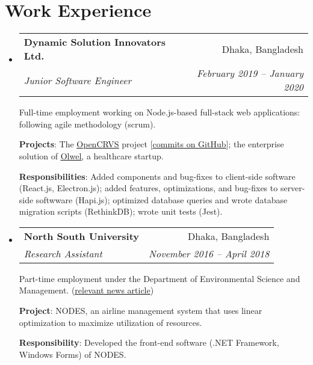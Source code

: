 \documentclass[a4-paper,10pt]{article}
\makeatletter
\newcommand{\resumeItem}[2]{
  \item\small{
    \textbf{#1}{: #2 \vspace{-2pt}}
  }
}
\newcommand{\resumeSubheading}[4]{
  \vspace{-1pt}\item
    \begin{tabular*}{0.97\textwidth}[t]{l@{\extracolsep{\fill}}r}
      \textbf{#1} & #2 \\
      \textit{#3} & \textit{ #4} \\
    \end{tabular*}\vspace{-5pt}
}
\newcommand{\resumeSubSubheading}[2]{
    \begin{tabular*}{0.97\textwidth}{l@{\extracolsep{\fill}}r}
      \textit{\small#1} & \textit{\small #2} \\
    \end{tabular*}\vspace{-5pt}
}
\newcommand{\resumeSubHeadingListStart}{\begin{itemize}[leftmargin=*]}
\newcommand{\resumeSubHeadingListEnd}{\end{itemize}}
\newcommand{\resumeItemListStart}{\begin{itemize}}
\newcommand{\resumeItemListEnd}{\end{itemize}\vspace{-5pt}}
\makeatother
\begin{document}
\section{Work Experience}
  \resumeSubHeadingListStart

    \resumeSubheading
      {Dynamic Solution Innovators Ltd.}{Dhaka, Bangladesh}
      {Junior Software Engineer}{February 2019 -- January 2020}
      
      Full-time employment working on Node.js-based full-stack web applications:  following agile methodology (scrum).
      
      \textbf{Projects}: The \href{https://opencrvs.org}{\underline{OpenCRVS}} project [\href{https://github.com/opencrvs/opencrvs-core/commits?author=maacpiash}{\underline{commits on GitHub}}]; the enterprise solution of \href{https://olwel.com}{\underline{Olwel}}, a healthcare startup.
      
      \textbf{Responsibilities}: Added components and bug-fixes to client-side software (React.js, Electron.js); added features, optimizations, and bug-fixes to server-side softwware (Hapi.js); optimized database queries and wrote database migration scripts (RethinkDB); wrote unit tests (Jest).
      

    \resumeSubheading
      {North South University}{Dhaka, Bangladesh}
      {Research Assistant}{November 2016 -- April 2018}
      
      Part-time employment under the Department of Environmental Science and Management. (\href{http://www.ipsnews.net/2017/05/flying-green-in-bangladesh/}{\underline{relevant news article}})
      
      \textbf{Project}: NODES, an airline management system that uses linear optimization to maximize utilization of resources.
      
      \textbf{Responsibility}: Developed the front-end software (.NET Framework, Windows Forms) of NODES.
     
  \resumeSubHeadingListEnd
  
\end{document}
